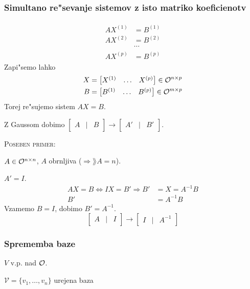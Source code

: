 \subsubsection{Simultano re"sevanje sistemov z isto matriko koeficienotv}
\begin{gather*}
\begin{aligned}
AX^{(1)} &= B^{(1)}\\
AX^{(2)} &= B^{(2)} \\
&\cdots \\
AX^{(p)} &= B^{(p)}
\end{aligned}
\end{gather*}
Zapi"semo lahko
\begin{align*}
X &= \begin{bmatrix}X^{(1)} & \ldots & X^{(p)}\end{bmatrix} \in \mathcal{O}^{n \times p} \\
B &= \begin{bmatrix}B^{(1)} & \ldots & B^{(p)}\end{bmatrix} \in \mathcal{O}^{m \times p}
\end{align*}
Torej re"sujemo sistem $AX = B$.

Z Gaussom dobimo $\begin{bmatrix}A & | & B\end{bmatrix} \to \begin{bmatrix}A' & | & B'\end{bmatrix}$.

\textsc{Poseben primer:}

$A \in \mathcal{O}^{n \times n}$, $A$ obrnljiva ($\Rightarrow \rang A = n$).

$A' = I$.
\begin{align*}
AX = B \iff IX = B' \Rightarrow B' &= X = A^{-1}B \\
B' &= A^{-1}B
\end{align*}
Vzamemo $B = I$, dobimo $B' = A^{-1}$.
\begin{equation*}
\begin{bmatrix}A & | & I\end{bmatrix} \to
\begin{bmatrix}I & | & A^{-1}\end{bmatrix}
\end{equation*}
%
\subsubsection{Sprememba baze}
$V$ v.p. nad $\mathcal{O}$.

$\mathcal{V} = \{v_1, \ldots, v_n\}$ urejena baza


